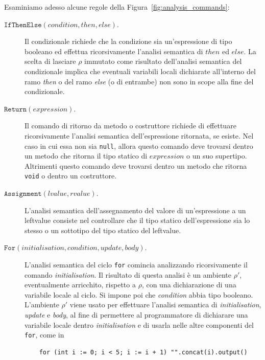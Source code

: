 Esaminiamo adesso alcune regole della Figura~\ref{fig:analysis_commands}:
%
\begin{description}
\item[\underline{$\mathtt{IfThenElse(\mathit{condition},\mathit{then},\mathit{else})}$}.]
  Il condizionale richiede che la condizione sia un'espressione di tipo
  booleano ed effettua ricorsivamente
  l'analisi semantica di $\mathit{then}$ ed $\mathit{else}$.
  La scelta di lasciare $\rho$ immutato come risultato
  dell'analisi semantica del condizionale implica che eventuali variabili
  locali dichiarate all'interno del ramo \textit{then} o del
  ramo \textit{else} (o di entrambe)
  non sono \piu in scope alla fine del condizionale.
\item[\underline{$\mathtt{Return(\mathit{expression})}$}.]
  Il comando di ritorno da metodo o costruttore richiede di effettuare
  ricorsivamente l'analisi semantica dell'espressione ritornata, se esiste.
  Nel caso in cui essa non sia \texttt{null}, allora questo comando deve
  trovarsi dentro un metodo che ritorna il tipo statico
  di $\mathit{expression}$ o un suo supertipo. Altrimenti questo comando
  deve trovarsi dentro un metodo che ritorna \texttt{void} o dentro
  un costruttore.
\item[\underline{$\mathtt{Assignment(\mathit{lvalue},\mathit{rvalue})}$}.]
  L'analisi semantica dell'assegnamento del valore di un'espressione
  a un leftvalue consiste nel controllare che il tipo statico dell'espressione
  sia lo stesso o un sottotipo del tipo statico del leftvalue.
\item[\underline{$\mathtt{For(\mathit{initialisation},\mathit{condition},
  \mathit{update},\mathit{body})}$}.]
  L'analisi semantica del ciclo \texttt{for} comincia analizzando
  ricorsivamente il comando \textit{initialisation}. Il risultato di questa
  analisi \`e un ambiente $\rho'$, eventualmente arricchito, rispetto a
  $\rho$, con una dichiarazione di una variabile locale al ciclo.
  Si impone poi che \textit{condition} abbia tipo booleano. L'ambiente $\rho'$
  viene usato per effettuare l'analisi
  semantica di \textit{initialisation}, \textit{update} e \textit{body},
  al fine di permettere al programmatore di dichiarare una variabile locale
  dentro \textit{initialisation} e di usarla nelle altre componenti del
  \texttt{for}, come in
  \begin{verbatim}
    for (int i := 0; i < 5; i := i + 1) "".concat(i).output()
  \end{verbatim}
  \vspace*{-2.5ex}

\end{description}
